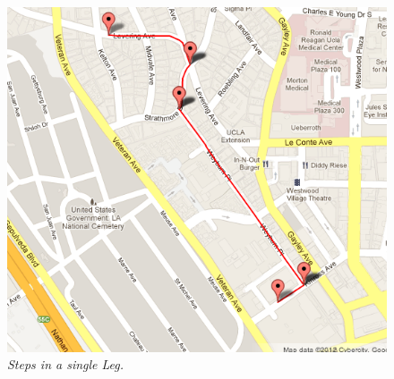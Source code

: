 \documentclass[10pt]{sigplan-proc-varsize}
\begin{document}
\begin{figure}
\begin{center}
\includegraphics[scale=0.35]{stepsInALeg.png}
\caption{\small \sl Steps in a single Leg.\label{fig:stepsInALeg}}
\end{center}
\end{figure}
\end{document}
